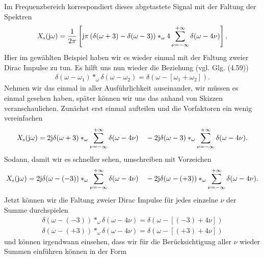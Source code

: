 \begin{ExCalc}
Im Frequenzbereich korrespondiert dieses abgetastete Signal mit der Faltung der Spektren
\begin{equation}
X_\mathrm{s}(\im\omega) = \frac{1}{2\pi}
\left[
\mathrm{j} \pi \left( \delta(\omega+3) - \delta(\omega-3) \right)
\ast_\omega 4 \sum_{\nu=-\infty}^{+\infty} \delta(\omega-4 \nu)
\right].
\end{equation}
%
Hier im gewählten Beispiel haben wir es wieder einmal mit der Faltung zweier
Dirac Impulse zu tun. Es hilft uns nun wieder die Beziehung (vgl. Glg. (4.59))
\begin{align}
\delta(\omega-\omega_1) \ast_\omega \delta(\omega-\omega_2)=
\delta(\omega-[\omega_1+\omega_2]).
\end{align}
Nehmen wir das einmal in aller Ausführlichkeit auseinander, wir müssen es einmal
gesehen haben, später können wir uns das anhand von Skizzen veranschaulichen.
Zunächst erst einmal aufteilen und die Vorfaktoren ein wenig vereinfachen
%
%
\begin{equation}
X_\mathrm{s}(\im\omega) = 2\im
\delta(\omega+3)
\ast_\omega \sum_{\nu=-\infty}^{+\infty} \delta(\omega-4 \nu)
\quad-
2\im
\delta(\omega-3)
\ast_\omega \sum_{\nu=-\infty}^{+\infty} \delta(\omega-4 \nu).
\end{equation}
Sodann, damit wir es schneller sehen, umschreiben mit Vorzeichen
\begin{equation}
X_\mathrm{s}(\im\omega) = 2\im
\delta(\omega-(-3))
\ast_\omega \sum_{\nu=-\infty}^{+\infty} \delta(\omega-4 \nu)
\quad-
2\im
\delta(\omega-(+3))
\ast_\omega \sum_{\nu=-\infty}^{+\infty} \delta(\omega-4 \nu).
\end{equation}
Jetzt können wir die Faltung zweier Dirac Impulse für jedes einzelne $\nu$
der Summe durchspielen
\begin{align}
\delta(\omega-(-3)) \ast_\omega \delta(\omega-4 \nu) = \delta(\omega - [(-3)+4\nu])\\
\delta(\omega-(+3)) \ast_\omega \delta(\omega-4 \nu) = \delta(\omega - [(+3)+4\nu])
\end{align}
und können irgendwann einsehen, dass wir für die Berücksichtigung aller $\nu$
wieder Summen einführen können in der Form

\end{ExCalc}
